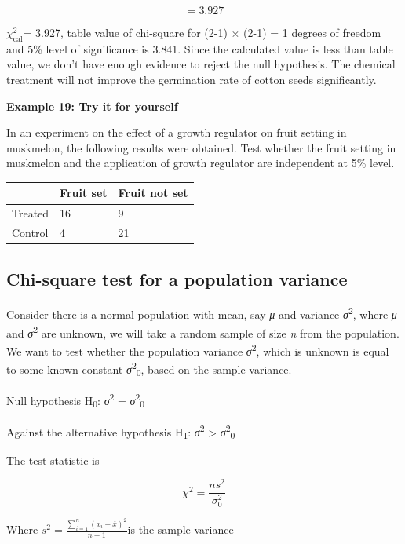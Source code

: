 \documentclass[
]{book}
\begin{document}
\[= 3.927\]

\(\chi_{\text{cal}}^{2}\)= 3.927, table value of chi-square for (2-1) × (2-1) = 1 degrees of freedom and 5\% level of significance is 3.841. Since the calculated value is less than table value, we don't have enough evidence to reject the null hypothesis. The chemical treatment will not improve the germination rate of cotton seeds significantly.

\textbf{Example 19: Try it for yourself}

In an experiment on the effect of a growth regulator on fruit setting in muskmelon, the following results were obtained. Test whether the fruit setting in muskmelon and the application of growth regulator are independent at 5\% level.

\begin{longtable}[]{@{}lll@{}}
\toprule\noalign{}
& Fruit set & Fruit not set \\
\midrule\noalign{}
\endhead
\bottomrule\noalign{}
\endlastfoot
Treated & 16 & 9 \\
Control & 4 & 21 \\
\end{longtable}

\hypertarget{chi-square-test-for-a-population-variance}{%
\subsection{Chi-square test for a population variance}\label{chi-square-test-for-a-population-variance}}

Consider there is a normal population with mean, say \emph{μ} and variance \emph{σ}\textsuperscript{2}, where \emph{μ} and \emph{σ}\textsuperscript{2} are unknown, we will take a random sample of size \emph{n} from the population. We want to test whether the population variance \emph{σ}\textsuperscript{2}, which is unknown is equal to some known constant \emph{σ}\textsuperscript{2}\textsubscript{0}, based on the sample variance.

Null hypothesis H\textsubscript{0}: \emph{σ}\textsuperscript{2} = \emph{σ}\textsuperscript{2}\textsubscript{0}

Against the alternative hypothesis H\textsubscript{1}: \emph{σ}\textsuperscript{2} \textgreater{} \emph{σ}\textsuperscript{2}\textsubscript{0}

The test statistic is

\[\chi^{2} = \frac{ns^{2}}{\sigma_{0}^{2}}\]

Where \(s^{2} = \frac{\sum_{i = 1}^{n}\left( x_{i} - \overline{x} \right)^{2}}{n - 1}\)is the sample variance
\end{document}
